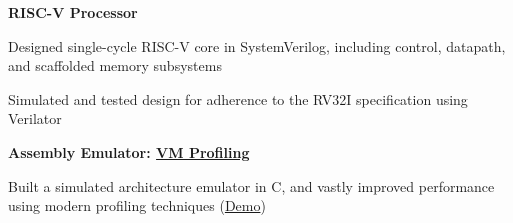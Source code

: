 \documentclass[10pt]{article}
\newenvironment{mylist}[1][]
{\itemize[nosep, wide=0pt, leftmargin=*, after=\strut]}
{\enditemize}
\begin{document}
\begin{minipage}[t]{\linewidth}
    \textbf{RISC-V Processor}
    \begin{mylist}
        \item Designed single-cycle RISC-V core in SystemVerilog, including control, datapath, and scaffolded memory subsystems
        \item Simulated and tested design for adherence to the RV32I specification using Verilator
    \end{mylist}
\end{minipage}

\begin{minipage}[t]{\linewidth}
    \textbf{Assembly Emulator: \href{https://github.com/liam-strand/comp-40-VM-Profiling}{VM Profiling}}
    \begin{mylist}
        \item Built a simulated architecture emulator in C, and vastly improved performance using modern profiling techniques (\href{https://youtu.be/OnzkSmFvxiM}{Demo})
    \end{mylist}
\end{minipage}
\end{document}
